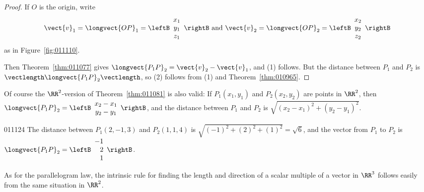 \begin{proof}
If $O$ is the origin, write 
\begin{equation*}
\vect{v}_{1} = \longvect{OP}_{1}= \leftB
\begin{array}{c}
x_{1} \\
y_{1} \\
z_{1}   
\end{array}
\rightB \mbox{ and }
\vect{v}_{2} = \longvect{OP}_{2} = \leftB
\begin{array}{c}
x_{2} \\
y_{2} \\
z_{2}   
\end{array}
\rightB
\end{equation*}
as in Figure~\ref{fig:011110}.


 Then Theorem~\ref{thm:011077} gives
$\longvect{P_{1}P}_{2} = \vect{v}_{2} - \vect{v}_{1}$, and (1) follows. But the distance between $P_{1}$ and $P_{2}$ is $\vectlength \longvect{P_{1}P}_{2} \vectlength$, so (2) follows from (1) and Theorem~\ref{thm:010965}.
\end{proof}

Of course the $\RR^2$-version of Theorem~\ref{thm:011081} is also valid: If $P_{1}(x_{1}, y_{1})$ and $P_{2}(x_{2}, y_{2})$ are points in $\RR^2$, then $\longvect{P_{1}P}_{2} = \leftB
\begin{array}{c}
x_{2} - x_{1} \\
y_{2} - y_{1}   
\end{array}
\rightB$, and the distance between $P_{1}$ and $P_{2}$ is $\sqrt{(x_{2} - x_{1})^2 + (y_{2} - y_{1})^2}$.

\begin{example}{}{011124}
The distance between $P_{1}(2, -1, 3)$ and $P_{2}(1, 1, 4)$ is $\sqrt{(-1)^2 + (2)^2 + (1)^2} = \sqrt{6}$, and the vector from  $P_{1}$ to $P_{2}$ is 
$\longvect{P_{1}P}_{2} = \leftB
\begin{array}{r}
-1 \\
2 \\
1  
\end{array}
\rightB$.
\end{example}

As for the parallelogram law, the intrinsic rule for finding the length and direction of a scalar multiple of a vector in $\RR^3$ follows easily from the same situation in $\RR^2$.


